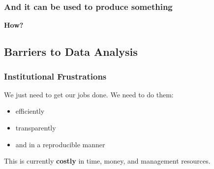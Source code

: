 \documentclass{beamer}
\begin{document}
{
\begin{frame}[plain]
\frametitle{And it can be used to produce something}
\end{frame}
}


\begin{frame}
\begin{center}
\Huge \textbf{How?}
\end{center}
\end{frame}

\subsection{Barriers to Data Analysis}

\begin{frame}
\frametitle{Institutional Frustrations}
We just need to get our jobs done. We need to do them:
\begin{itemize}
  \item efficiently
  \item transparently 
  \item and in a reproducible manner
\end{itemize}

This is currently \Large \textbf{costly} \normalsize in time, money, and management resources.
\end{frame}
\end{document}
